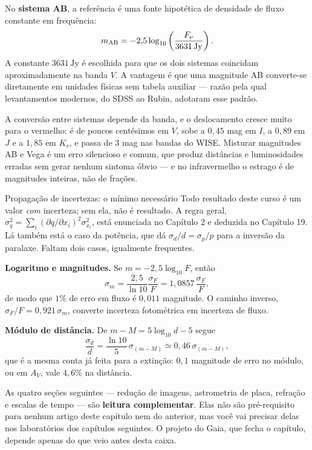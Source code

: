 \documentclass[11pt,a4paper]{article}
\begin{document}
No \textbf{sistema AB}, a referência é uma fonte hipotética de densidade de fluxo constante em frequência:
\[
m_{\rm AB}=-2{,}5\log_{10}\left(\frac{F_\nu}{3631\,\mathrm{Jy}}\right).
\]
A constante $3631\,\mathrm{Jy}$ é escolhida para que os dois sistemas coincidam aproximadamente na banda $V$. A vantagem é que uma magnitude AB converte-se diretamente em unidades físicas sem tabela auxiliar --- razão pela qual levantamentos modernos, do SDSS ao Rubin, adotaram esse padrão.

A conversão entre sistemas depende da banda, e o deslocamento cresce muito para o vermelho: é de poucos centésimos em $V$, sobe a $0{,}45$ mag em $I$, a $0{,}89$ em $J$ e a $1{,}85$ em $K_s$, e passa de $3$ mag nas bandas do WISE. Misturar magnitudes AB e Vega é um erro silencioso e comum, que produz distâncias e luminosidades erradas sem gerar nenhum sintoma óbvio --- e no infravermelho o estrago é de magnitudes inteiras, não de frações.

\begin{lessonblock}[borderline west={2pt}{0pt}{astroGold}]{Propagação de incertezas: o mínimo necessário}
Todo resultado deste curso é um valor \emph{com} incerteza; sem ela, não é resultado. A
regra geral, $\sigma_q^{2}=\sum_i(\partial q/\partial x_i)^{2}\sigma_{x_i}^{2}$, está
enunciada no Capítulo 2 e deduzida no Capítulo 19. Lá também está o caso da potência, que dá
$\sigma_d/d=\sigma_p/p$ para a inversão da paralaxe. Faltam dois casos, igualmente
frequentes.

\textbf{Logaritmo e magnitudes.} Se $m=-2{,}5\log_{10}F$, então
\[
\sigma_m=\frac{2{,}5}{\ln10}\frac{\sigma_F}{F}=1{,}0857\,\frac{\sigma_F}{F},
\]
de modo que $1\%$ de erro em fluxo é $0{,}011$ magnitude. O caminho inverso,
$\sigma_F/F=0{,}921\,\sigma_m$, converte incerteza fotométrica em incerteza de fluxo.

\textbf{Módulo de distância.} De $m-M=5\log_{10}d-5$ segue
\[
\frac{\sigma_d}{d}=\frac{\ln10}{5}\,\sigma_{(m-M)}\simeq0{,}46\,\sigma_{(m-M)},
\]
que é a mesma conta já feita para a extinção: $0{,}1$ magnitude de erro no módulo, ou em
$A_V$, vale $4{,}6\%$ na distância.
\end{lessonblock}

\begin{noticebox}
As quatro seções seguintes --- redução de imagens, astrometria de placa, refração e escalas de tempo --- são \textbf{leitura complementar}. Elas não são pré-requisito para nenhum artigo deste capítulo nem do anterior, mas você vai precisar delas nos laboratórios dos capítulos seguintes. O projeto do Gaia, que fecha o capítulo, depende apenas do que veio antes desta caixa.
\end{noticebox}
\end{document}
